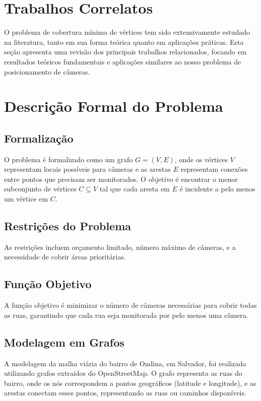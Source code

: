 \documentclass[12pt, a4paper]{report}
\begin{document}
\chapter{Trabalhos Correlatos}
O problema de cobertura mínima de vértices tem sido extensivamente estudado na literatura, tanto em sua forma teórica quanto em aplicações práticas. Esta seção apresenta uma revisão dos principais trabalhos relacionados, focando em resultados teóricos fundamentais e aplicações similares ao nosso problema de posicionamento de câmeras.

\chapter{Descrição Formal do Problema}

\section{Formalização}
O problema é formalizado como um grafo \(G = (V, E)\), onde os vértices \(V\) representam locais possíveis para câmeras e as arestas \(E\) representam conexões entre pontos que precisam ser monitorados. O objetivo é encontrar o menor subconjunto de vértices \(C \subseteq V\) tal que cada aresta em \(E\) é incidente a pelo menos um vértice em \(C\).

\section{Restrições do Problema}
As restrições incluem orçamento limitado, número máximo de câmeras, e a necessidade de cobrir áreas prioritárias.

\section{Função Objetivo}
A função objetivo é minimizar o número de câmeras necessárias para cobrir todas as ruas, garantindo que cada rua seja monitorada por pelo menos uma câmera.

\section{Modelagem em Grafos}

A modelagem da malha viária do bairro de Ondina, em Salvador, foi realizada utilizando grafos extraídos do OpenStreetMap. O grafo representa as ruas do bairro, onde os nós correspondem a pontos geográficos (latitude e longitude), e as arestas conectam esses pontos, representando as ruas ou caminhos disponíveis.
\end{document}
